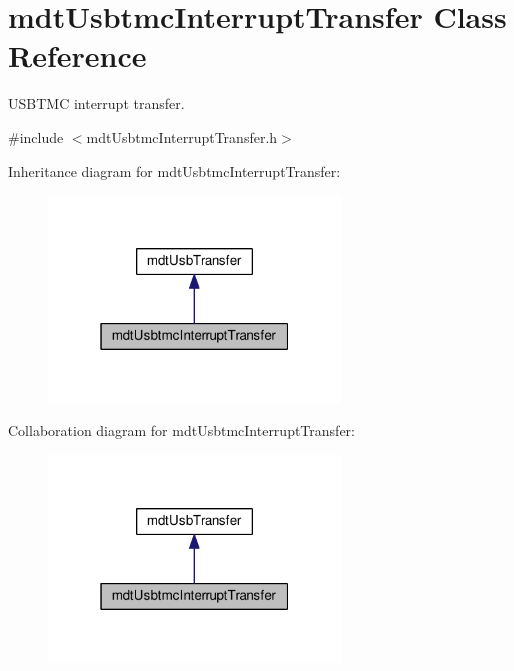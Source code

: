 \hypertarget{classmdt_usbtmc_interrupt_transfer}{\section{mdt\-Usbtmc\-Interrupt\-Transfer Class Reference}
\label{classmdt_usbtmc_interrupt_transfer}
}


U\-S\-B\-T\-M\-C interrupt transfer.  




{\ttfamily \#include $<$mdt\-Usbtmc\-Interrupt\-Transfer.\-h$>$}



Inheritance diagram for mdt\-Usbtmc\-Interrupt\-Transfer\-:
\nopagebreak
\begin{figure}[H]
\begin{center}
\leavevmode
\includegraphics[width=220pt]{classmdt_usbtmc_interrupt_transfer__inherit__graph}
\end{center}
\end{figure}


Collaboration diagram for mdt\-Usbtmc\-Interrupt\-Transfer\-:
\nopagebreak
\begin{figure}[H]
\begin{center}
\leavevmode
\includegraphics[width=220pt]{classmdt_usbtmc_interrupt_transfer__coll__graph}
\end{center}
\end{figure}
